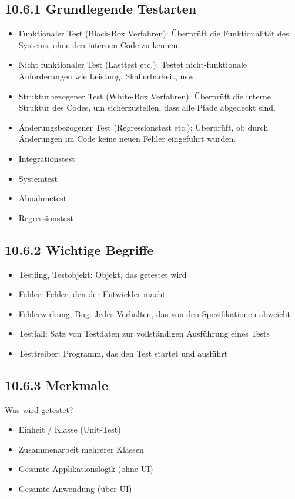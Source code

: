\documentclass[10pt]{article}
\begin{document}
\subsection*{10.6.1 Grundlegende Testarten}
\begin{itemize}
  \item Funktionaler Test (Black-Box Verfahren): Überprüft die Funktionalität des Systems, ohne den internen Code zu kennen.
  \item Nicht funktionaler Test (Lasttest etc.): Testet nicht-funktionale Anforderungen wie Leistung, Skalierbarkeit, usw.
  \item Strukturbezogener Test (White-Box Verfahren): Überprüft die interne Struktur des Codes, um sicherzustellen, dass alle Pfade abgedeckt sind.
  \item Änderungsbezogener Test (Regressionstest etc.): Überprüft, ob durch Änderungen im Code keine neuen Fehler eingeführt wurden.
  \item Integrationstest
  \item Systemtest
  \item Abnahmetest
  \item Regressionstest
\end{itemize}

\subsection*{10.6.2 Wichtige Begriffe}
\begin{itemize}
  \item Testling, Testobjekt: Objekt, das getestet wird
  \item Fehler: Fehler, den der Entwickler macht
  \item Fehlerwirkung, Bug: Jedes Verhalten, das von den Spezifikationen abweicht
  \item Testfall: Satz von Testdaten zur vollständigen Ausführung eines Tests
  \item Testtreiber: Programm, das den Test startet und ausführt
\end{itemize}

\subsection*{10.6.3 Merkmale}
Was wird getestet?

\begin{itemize}
  \item Einheit / Klasse (Unit-Test)
  \item Zusammenarbeit mehrerer Klassen
  \item Gesamte Applikationslogik (ohne UI)
  \item Gesamte Anwendung (über UI)
\end{itemize}
\end{document}
